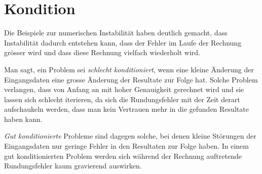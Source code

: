 %
%
%
\section{Kondition
\label{buch:section:kondition-allg}}
%
Die Beispiele zur numerischen Instabilität haben deutlich gemacht,
dass Instabilität dadurch entstehen kann, dass der Fehler im
Laufe der Rechnung grösser wird und dass diese Rechnung vielfach
wiederholt wird.
%
%

Man sagt, ein Problem sei {\em schlecht konditioniert}, wenn eine
%
%
kleine Änderung der Eingangsdaten eine grosse Änderung der Resultate
zur Folge hat.
Solche Problem verlangen, dass von Anfang an mit hoher Genauigkeit
gerechnet wird und sie lassen sich schlecht iterieren, da sich
die Rundungsfehler mit der Zeit derart aufschaukeln werden, dass
man kein Vertrauen mehr in die gefunden Resultate haben kann.
%

{\em Gut konditionierte} Probleme sind dagegen solche, bei denen kleine
%
%
Störungen der Eingangsdaten nur geringe Fehler in den Resultaten
zur Folge haben.
In einem gut konditionierten Problem werden sich während der
Rechnung auftretende Rundungsfehler kaum gravierend auswirken.





